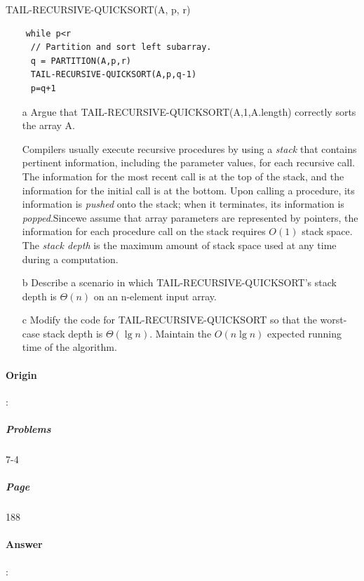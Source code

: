 \documentclass{article}
\begin{document}
  TAIL-RECURSIVE-QUICKSORT(A, p, r)

  \begin{lstlisting}
    while p<r
     // Partition and sort left subarray.
     q = PARTITION(A,p,r)
     TAIL-RECURSIVE-QUICKSORT(A,p,q-1)
     p=q+1
  \end{lstlisting}

  \begin{enumerate}
    \item[a] Argue that TAIL-RECURSIVE-QUICKSORT(A,1,A.length) correctly sorts the array A.
    

    Compilers usually execute recursive procedures by using a \textit{stack} that contains pertinent information, including the parameter values, for each recursive call. The information for the most recent call is at the top of the stack, and the information for the initial call is at the bottom. Upon calling a procedure, its information is \textit{pushed} onto the stack; when it terminates, its information is \textit{popped}.Sincewe assume that array parameters are represented by pointers, the information for each procedure call on the stack requires $O(1)$ stack space. The \textit{stack depth} is the maximum amount of stack space used at any time during a computation.
    
    
    \item[b] Describe a scenario in which TAIL-RECURSIVE-QUICKSORT's stack depth is $\Theta(n)$ on an n-element input array.
    \item[c] Modify the code for TAIL-RECURSIVE-QUICKSORT so that the worst-case stack depth is $\Theta(\lg n)$. Maintain the $O(n \lg n)$ expected running time of the algorithm.
  \end{enumerate}

  \paragraph{Origin}:
    \subparagraph{Problems}7-4
    \subparagraph{Page}188
  \paragraph{Answer}:
\end{document}
